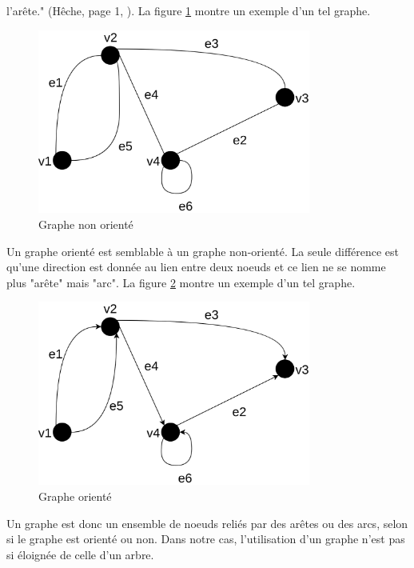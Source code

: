 l'arête." (Hêche, page 1, \cite{ref28}). La figure \ref{graph_undirected} montre un exemple d'un tel 
graphe. 
\begin{figure}
    \begin{center}
        \includegraphics[width=0.8\textwidth]{images/graph_undirected.png}
    \end{center}
    \caption{Graphe non orienté}
    \label{graph_undirected}
\end{figure}
Un graphe orienté est semblable à un graphe non-orienté. La seule différence est qu'une direction 
est donnée au lien entre deux noeuds et ce lien ne se nomme plus "arête" mais "arc". La figure 
\ref{graph_directed} montre un exemple d'un tel graphe.
\begin{figure}
    \begin{center}
        \includegraphics[width=0.8\textwidth]{images/graph_directed.png}
    \end{center}
    \caption{Graphe orienté}
    \label{graph_directed}
\end{figure}
Un graphe est donc un ensemble de noeuds reliés par des arêtes ou des arcs, selon si le graphe est 
orienté ou non. Dans notre cas, l'utilisation d'un graphe n'est pas si éloignée de celle d'un arbre. 
